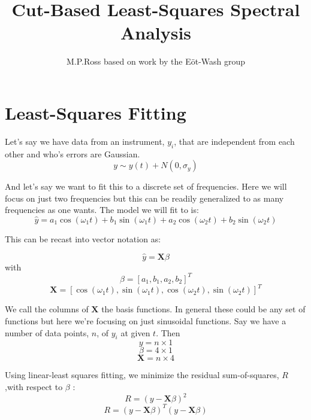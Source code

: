 \documentclass{article}
\title{Cut-Based Least-Squares Spectral Analysis}
\author{M.P.Ross based on work by the E\"ot-Wash group}
\begin{document}
\maketitle

\section{Least-Squares Fitting}

Let's say we have data from an instrument, $y_i$, that are independent from each other and who's errors are Gaussian.
\begin{equation}
y\sim y(t)+N(0, \sigma_y)
\end{equation}

And let's say we want to fit this to a discrete set of frequencies. Here we will focus on just two frequencies but this can be readily generalized to as many frequencies as one wants. The model we will fit to is:
\begin{equation}
\hat{y}= a_1 \cos(\omega_1 t)+b_1 \sin(\omega_1 t)+a_2 \cos(\omega_2 t)+b_2 \sin(\omega_2 t)
\end{equation}

This can be recast into vector notation as:

\begin{equation}
\hat{y}= \mathbf{X} \beta
\end{equation}
with
\begin{equation}
\beta = [a_1, b_1, a_2, b_2]^T
\end{equation}
\begin{equation}
\mathbf{X}= [\cos(\omega_1 t), \sin(\omega_1 t), \cos(\omega_2 t), \sin(\omega_2 t)]^T
\end{equation}

We call the columns of $\mathbf{X}$ the basis functions. In general these could be any set of functions but here we're focusing on just sinusoidal functions. Say we have a number of data points, $n$, of $y_i$ at given $t$. Then 
\begin{equation}
y=n\times 1
\end{equation}
\begin{equation}
\beta=4 \times 1
\end{equation}
\begin{equation}
\mathbf{X}=n \times 4
\end{equation}

Using linear-least squares fitting, we minimize the residual sum-of-squares, $R$,with respect to $\beta$ :
\begin{equation}
R=(y- \mathbf{X} \beta)^2
\end{equation}
\begin{equation}
R=(y- \mathbf{X} \beta)^T(y- \mathbf{X} \beta)
\end{equation}
\end{document}
